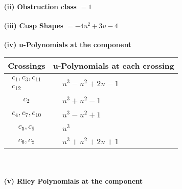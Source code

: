 \documentclass[1p]{elsarticle_modified}
\theoremstyle{definition}
\begin{document}
\flushleft \textbf{(ii) Obstruction class $= 1$}\\~\\
\flushleft \textbf{(iii) Cusp Shapes $= -4 u^2+3 u-4$}\\~\\
\newpage\renewcommand{\arraystretch}{1}
\flushleft \textbf{(iv) u-Polynomials at the component}\newline \\
\begin{tabular}{m{50pt}|m{274pt}}
Crossings & \hspace{64pt}u-Polynomials at each crossing \\
\hline $$\begin{aligned}c_{1},c_{3},c_{11}\\c_{12}\end{aligned}$$&$\begin{aligned}
&u^3- u^2+2 u-1
\end{aligned}$\\
\hline $$\begin{aligned}c_{2}\end{aligned}$$&$\begin{aligned}
&u^3+u^2-1
\end{aligned}$\\
\hline $$\begin{aligned}c_{4},c_{7},c_{10}\end{aligned}$$&$\begin{aligned}
&u^3- u^2+1
\end{aligned}$\\
\hline $$\begin{aligned}c_{5},c_{9}\end{aligned}$$&$\begin{aligned}
&u^3
\end{aligned}$\\
\hline $$\begin{aligned}c_{6},c_{8}\end{aligned}$$&$\begin{aligned}
&u^3+u^2+2 u+1
\end{aligned}$\\
\hline
\end{tabular}\\~\\
\newpage\renewcommand{\arraystretch}{1}
\flushleft \textbf{(v) Riley Polynomials at the component}\newline \\
\end{document}
